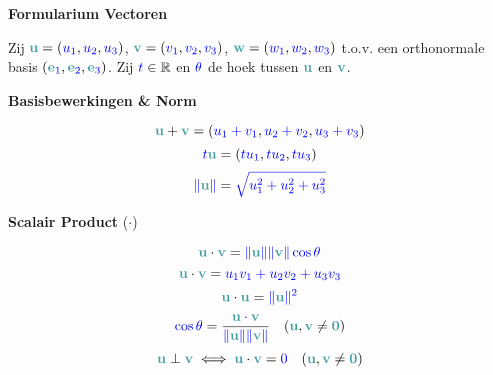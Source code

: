 \documentclass[12pt]{article}
\renewcommand{\vec}[1]{\textcolor{vectorTeal}{\mathbf{#1}}}
\newcommand{\evec}[1]{\vec{e}_{\textcolor{scalarBrightBlue}{#1}}}
\newcommand{\scalar}[1]{\textcolor{scalarBrightBlue}{#1}}
\begin{document}
\begin{center}
\Large \textbf{Formularium Vectoren}
\end{center}

\vspace{1em} %

Zij $\vec{u} = (\scalar{u_1}, \scalar{u_2}, \scalar{u_3})$, $\vec{v} = (\scalar{v_1}, \scalar{v_2}, \scalar{v_3})$, $\vec{w} = (\scalar{w_1}, \scalar{w_2}, \scalar{w_3})$ t.o.v. een orthonormale basis $(\evec{1}, \evec{2}, \evec{3})$. Zij $\scalar{t} \in \mathbb{R}$ en $\scalar{\theta}$ de hoek tussen $\vec{u}$ en $\vec{v}$.

\vspace{1.5em} %
{\centering %
\textcolor{headerBrown}{\large\textbf{Basisbewerkingen \& Norm}}
\par %
}%
\[
\vec{u} + \vec{v} = (\scalar{u_1 + v_1}, \scalar{u_2 + v_2}, \scalar{u_3 + v_3})
\]
\[
\scalar{t}\vec{u} = (\scalar{t u_1}, \scalar{t u_2}, \scalar{t u_3})
\]
\[
\scalar{\|\vec{u}\|} = \scalar{\sqrt{u_1^2 + u_2^2 + u_3^2}}
\]

\vspace{1.5em} %
{\centering
\textcolor{headerBrown}{\large\textbf{Scalair Product} ($\cdot$)}
\par
}%
\[
\vec{u} \cdot \vec{v} = \scalar{\|\vec{u}\| \|\vec{v}\| \cos \theta}
\]
\[
\vec{u} \cdot \vec{v} = \scalar{u_1 v_1 + u_2 v_2 + u_3 v_3}
\]
\[
\vec{u} \cdot \vec{u} = \scalar{\|\vec{u}\|^2}
\]
\[
\scalar{\cos \theta} = \frac{\scalar{\vec{u} \cdot \vec{v}}}{\scalar{\|\vec{u}\| \|\vec{v}\|}} \quad (\vec{u}, \vec{v} \neq \vec{0})
\]
\[
\vec{u} \perp \vec{v} \iff \vec{u} \cdot \vec{v} = \scalar{0} \quad (\vec{u}, \vec{v} \neq \vec{0})
\]
\end{document}
